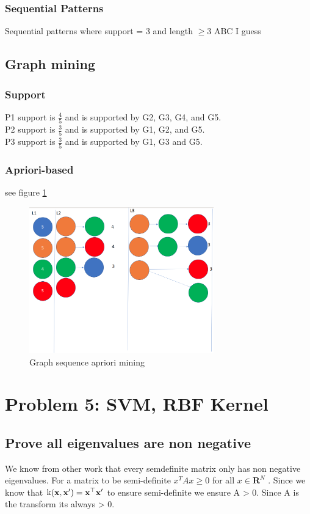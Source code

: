 \documentclass[11pt]{article}
\begin{document}
\subsubsection{Sequential Patterns}
Sequential patterns where support = 3 and length $\ge 3$
ABC I guess
\subsection{Graph mining}
\subsubsection{Support}
P1 support is $\frac{4}{5}$ and is supported by G2, G3, G4, and G5. \\
P2 support is $\frac{3}{5}$ and is supported by G1, G2, and G5. \\
P3 support is $\frac{3}{5}$ and is supported by G1, G3 and G5.
\subsubsection{Apriori-based}
see figure \ref{fig:graph-apri}
\begin{figure}[]
\centering
\includegraphics[width=8cm]{Assignments/Assignment1/graphapri.png}
\caption{Graph sequence apriori mining}
\label{fig:graph-apri}
\end{figure}
\section{Problem 5: SVM, RBF Kernel}
\subsection{Prove all eigenvalues are non negative}
We know from other work that every semdefinite matrix only has non negative eigenvalues. 
For a matrix to be semi-definite $x^TAx \ge 0$ for all $x \in \mathbf{R}^N $ . Since we know that $\text{k}(\bold{x}, \bold{x}') = \bold{x}^\top \bold{x}'$ to ensure semi-definite we ensure A > 0. Since A is the transform its always > 0. 
\end{document}
